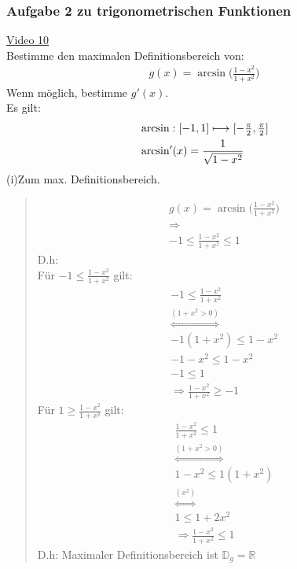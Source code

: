 \subsubsection{Aufgabe 2 zu trigonometrischen Funktionen}
\href{https://youtu.be/dyxaIIiA6r4}{Video 10}\\
Bestimme den maximalen Definitionsbereich von:\\
\begin{align*}
g(x)=\arcsin\bigg(\frac{1-x^2}{1+x^2}\bigg)
\end{align*}
Wenn möglich, bestimme $ g'(x) $.\\
Es gilt:\\
\begin{align*}
&\arcsin: [-1,1]\longmapsto [-\genfrac{}{}{}{1.7}{\pi }{2 },\genfrac{}{}{}{1.7}{\pi }{2 }]\\
&\arcsin'(x)=\frac{1}{\sqrt{1-x^2}}
\end{align*}
(i)\;\;Zum max. Definitionsbereich.\\
\begin{quote}
	\begin{align*}
	&g(x)=\arcsin\bigg(\frac{1-x^2}{1+x^2}\bigg)\\
	&\Rightarrow\\
	&-1\leq\frac{1-x^2}{1+x^2}\leq 1
	\end{align*}
	D.h:\\
	Für $ -1\leq\frac{1-x^2}{1+x^2} $ gilt:\\
	\begin{align*}
	&-1\leq\frac{1-x^2}{1+x^2}\\
	&\overset{(1+x^2>0)}{\Leftrightarrow}\\
	&-1(1+x^2)\leq 1-x^2\\
	&-1-x^2\leq 1-x^2\\
	&-1\leq 1\\
	&\Rightarrow \frac{1-x^2}{1+x^2}\geq -1
	\end{align*}
	Für $ 1\geq\frac{1-x^2}{1+x^2} $ gilt:\\
	\begin{align*}
	&\frac{1-x^2}{1+x^2}\leq 1\\
	&\overset{(1+x^2>0)}{\Leftrightarrow}\\
	&1-x^2\leq 1(1+x^2)\\
	&\overset{(x^2)}{\Leftrightarrow}\\
	&1\leq 1+2x^2\\
	&\Rightarrow \frac{1-x^2}{1+x^2}\leq 1
	\end{align*}	
	D.h: Maximaler Definitionsbereich ist $ \mathbb{D}_g =\mathbb{R}$\\
\end{quote}
